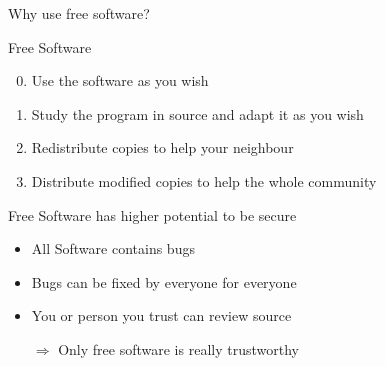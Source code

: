 \begin{frame}{Why use free software?}
	\begin{block}{Free Software}
		\begin{enumerate}
			\setcounter{enumi}{-1}
			\renewcommand{\theenumi}{\bfseries \arabic{enumi}}
			\item Use the software as you wish
			\item Study the program in source and adapt it as you wish
			\item Redistribute copies to help your neighbour
			\item Distribute modified copies to help the whole community
		\end{enumerate}
	\end{block}

	\begin{block}{Free Software has higher potential to be secure}
		\begin{itemize}
			\item All Software contains bugs
			\item Bugs can be fixed by everyone for everyone
			\item You or person you trust can review source
			\item[$\Rightarrow$] Only free software is really trustworthy
		\end{itemize}
	\end{block}
\end{frame}

